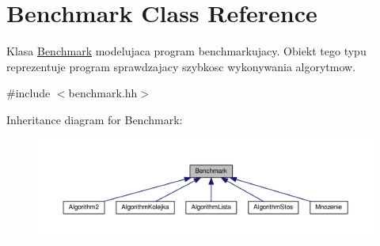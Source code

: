 \hypertarget{class_benchmark}{}\section{Benchmark Class Reference}
\label{class_benchmark}


Klasa \hyperlink{class_benchmark}{Benchmark} modelujaca program benchmarkujacy. Obiekt tego typu reprezentuje program sprawdzajacy szybkosc wykonywania algorytmow.  




{\ttfamily \#include $<$benchmark.\+hh$>$}



Inheritance diagram for Benchmark\+:\nopagebreak
\begin{figure}[H]
\begin{center}
\leavevmode
\includegraphics[width=350pt]{class_benchmark__inherit__graph}
\end{center}
\end{figure}

